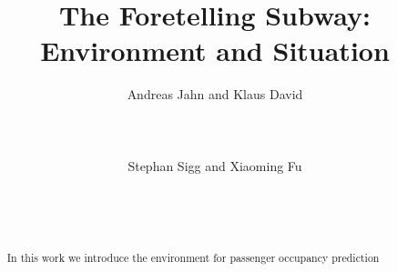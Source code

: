 \documentclass{sig-alternate}
\begin{document}
\title{The Foretelling Subway: Environment and Situation}

%
\author{
%
%
\alignauthor
Andreas Jahn and Klaus David\\
       \\
       \\
       \\
\alignauthor
Stephan Sigg and Xiaoming Fu\\
       \\
       \\
       \\
}

\maketitle

\begin{abstract}
In this work we introduce the environment for passenger occupancy prediction
\end{abstract}







\let\oldtocsubsection=\tocsubsection


\balance

\label{sec:references}

\end{document}
